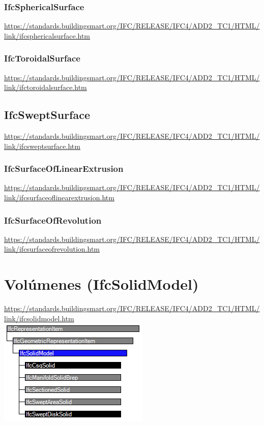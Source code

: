 \documentclass[spanish,12pt,a4paper,final,oneside]{book}
\begin{document}
\subsubsection{IfcSphericalSurface}
\url{https://standards.buildingsmart.org/IFC/RELEASE/IFC4/ADD2_TC1/HTML/link/ifcsphericalsurface.htm}

\subsubsection{IfcToroidalSurface}
\url{https://standards.buildingsmart.org/IFC/RELEASE/IFC4/ADD2_TC1/HTML/link/ifctoroidalsurface.htm}


\subsection{IfcSweptSurface}
\url{https://standards.buildingsmart.org/IFC/RELEASE/IFC4/ADD2_TC1/HTML/link/ifcsweptsurface.htm}

\subsubsection{IfcSurfaceOfLinearExtrusion}
\url{https://standards.buildingsmart.org/IFC/RELEASE/IFC4/ADD2_TC1/HTML/link/ifcsurfaceoflinearextrusion.htm}

\subsubsection{IfcSurfaceOfRevolution}
\url{https://standards.buildingsmart.org/IFC/RELEASE/IFC4/ADD2_TC1/HTML/link/ifcsurfaceofrevolution.htm}



\section{Volúmenes (IfcSolidModel)}
\url{https://standards.buildingsmart.org/IFC/RELEASE/IFC4/ADD2_TC1/HTML/link/ifcsolidmodel.htm}
\\ \includegraphics[scale=1]{jerarquia de IfcSolidModel}
\end{document}
